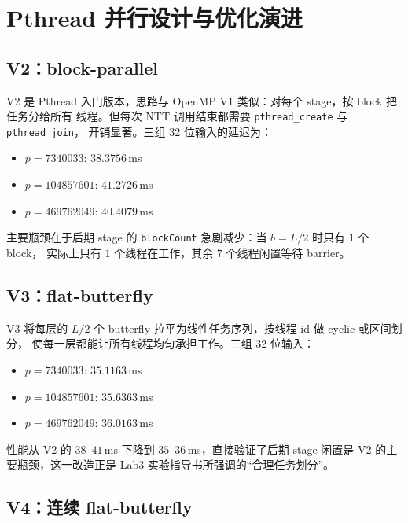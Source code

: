 \documentclass[UTF8,a4paper,10pt]{ctexart}
\begin{document}
\section{Pthread 并行设计与优化演进}

\subsection{V2：block-parallel}

V2 是 Pthread 入门版本，思路与 OpenMP V1 类似：对每个 stage，按 block 把任务分给所有
线程。但每次 NTT 调用结束都需要 \texttt{pthread\_create} 与 \texttt{pthread\_join}，
开销显著。三组 32 位输入的延迟为：

\begin{itemize}
  \item $p = 7340033$: $38.3756$\,ms
  \item $p = 104857601$: $41.2726$\,ms
  \item $p = 469762049$: $40.4079$\,ms
\end{itemize}

主要瓶颈在于后期 stage 的 \texttt{blockCount} 急剧减少：当 $b = L/2$ 时只有 $1$ 个 block，
实际上只有 $1$ 个线程在工作，其余 $7$ 个线程闲置等待 barrier。

\subsection{V3：flat-butterfly}

V3 将每层的 $L/2$ 个 butterfly 拉平为线性任务序列，按线程 id 做 cyclic 或区间划分，
使每一层都能让所有线程均匀承担工作。三组 32 位输入：

\begin{itemize}
  \item $p = 7340033$: $35.1163$\,ms
  \item $p = 104857601$: $35.6363$\,ms
  \item $p = 469762049$: $36.0163$\,ms
\end{itemize}

性能从 V2 的 $38$--$41$\,ms 下降到 $35$--$36$\,ms，直接验证了后期 stage 闲置是
V2 的主要瓶颈，这一改造正是 Lab3 实验指导书所强调的``合理任务划分''。

\subsection{V4：连续 flat-butterfly}
\end{document}
